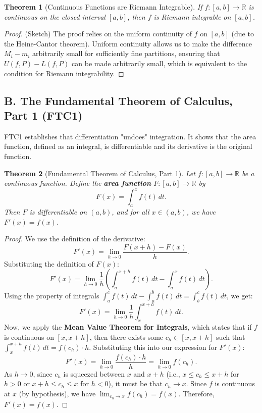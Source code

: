 \documentclass[11pt, a4paper]{article}
\theoremstyle{plain} %
\newtheorem{theorem}{Theorem}[section] %
\theoremstyle{definition} %
\theoremstyle{remark} %
\begin{document}
\begin{theorem}[Continuous Functions are Riemann Integrable]
    \label{thm:continuous_integrable}
    If \( f: [a,b] \to \mathbb{R} \) is continuous on the closed interval \( [a,b] \), then \( f \) is Riemann integrable on \( [a,b] \).
\end{theorem}
\begin{proof}
    (Sketch) The proof relies on the uniform continuity of \( f \) on \( [a,b] \) (due to the Heine-Cantor theorem). Uniform continuity allows us to make the difference \( M_i - m_i \) arbitrarily small for sufficiently fine partitions, ensuring that \( U(f,P) - L(f,P) \) can be made arbitrarily small, which is equivalent to the condition for Riemann integrability.
\end{proof}

\subsection{B. The Fundamental Theorem of Calculus, Part 1 (FTC1)}

FTC1 establishes that differentiation "undoes" integration. It shows that the area function, defined as an integral, is differentiable and its derivative is the original function.

\begin{theorem}[Fundamental Theorem of Calculus, Part 1]
    \label{thm:ftc_part1}
    Let \( f: [a,b] \to \mathbb{R} \) be a continuous function. Define the \textbf{area function} \( F: [a,b] \to \mathbb{R} \) by
    \[ F(x) = \int_a^x f(t) \, dt. \]
    Then \( F \) is differentiable on \( (a,b) \), and for all \( x \in (a,b) \), we have \( F'(x) = f(x) \).
\end{theorem}

\begin{proof}
    We use the definition of the derivative:
    \[ F'(x) = \lim_{h \to 0} \frac{F(x+h) - F(x)}{h}. \]
    Substituting the definition of \( F(x) \):
    \[ F'(x) = \lim_{h \to 0} \frac{1}{h} \left( \int_a^{x+h} f(t) \, dt - \int_a^x f(t) \, dt \right). \]
    Using the property of integrals \( \int_a^c f(t) \, dt - \int_a^b f(t) \, dt = \int_b^c f(t) \, dt \), we get:
    \[ F'(x) = \lim_{h \to 0} \frac{1}{h} \int_x^{x+h} f(t) \, dt. \]
    Now, we apply the \textbf{Mean Value Theorem for Integrals}, which states that if \( f \) is continuous on \( [x, x+h] \), then there exists some \( c_h \in [x, x+h] \) such that \( \int_x^{x+h} f(t) \, dt = f(c_h) \cdot h \).
    Substituting this into our expression for \( F'(x) \):
    \[ F'(x) = \lim_{h \to 0} \frac{f(c_h) \cdot h}{h} = \lim_{h \to 0} f(c_h). \]
    As \( h \to 0 \), since \( c_h \) is squeezed between \( x \) and \( x+h \) (i.e., \( x \le c_h \le x+h \) for \( h>0 \) or \( x+h \le c_h \le x \) for \( h<0 \)), it must be that \( c_h \to x \).
    Since \( f \) is continuous at \( x \) (by hypothesis), we have \( \lim_{c_h \to x} f(c_h) = f(x) \).
    Therefore, \( F'(x) = f(x) \).
\end{proof}
\end{document}
